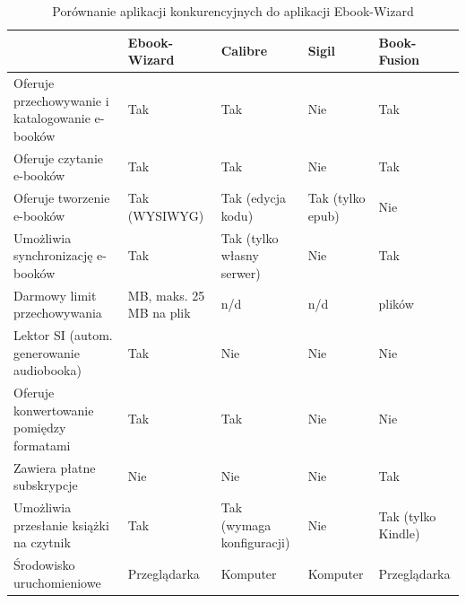 \begin{table}
    \renewcommand{\arraystretch}{1.5} %
    \caption{Porównanie aplikacji konkurencyjnych do aplikacji Ebook-Wizard}

    \centering
    \begin{tabular}{|>{\centering\arraybackslash}m{4.7cm}|>{\centering\arraybackslash}m{2.7cm}|>{\centering\arraybackslash}m{2.1cm}|>{\centering\arraybackslash}m{2cm}|>{\centering\arraybackslash}m{2.3cm}|}
        \hline
        & \textbf{Ebook-Wizard} & \textbf{Calibre} & \textbf{Sigil}  & \textbf{Book-Fusion} \\ \hline
        Oferuje przechowywanie i katalogowanie e-booków & Tak & Tak & Nie & Tak \\ \hline
        Oferuje czytanie e-booków & Tak & Tak & Nie & Tak \\ \hline
        Oferuje tworzenie e-booków & Tak (WYSIWYG) & Tak (edycja kodu) & Tak (tylko epub) & Nie \\ \hline
        Umożliwia synchronizację e-booków & Tak & Tak (tylko własny serwer) & Nie & Tak \\ \hline
        Darmowy limit przechowywania & 500 MB, maks. 25 MB na plik & n/d & n/d & 10 plików \\ \hline
        Lektor SI (autom. generowanie audiobooka) & Tak & Nie & Nie & Nie \\ \hline
        Oferuje konwertowanie pomiędzy formatami & Tak & Tak & Nie & Nie \\ \hline
        Zawiera płatne subskrypcje & Nie & Nie & Nie & Tak \\ \hline
        Umożliwia przesłanie książki na czytnik & Tak & Tak (wymaga konfiguracji) & Nie & Tak (tylko Kindle) \\ \hline
        Środowisko uruchomieniowe & Przeglądarka & Komputer & Komputer & Przeglądarka \\
      \hline
    \end{tabular}
    \label{tab:other_apps_comparision}
\end{table}
